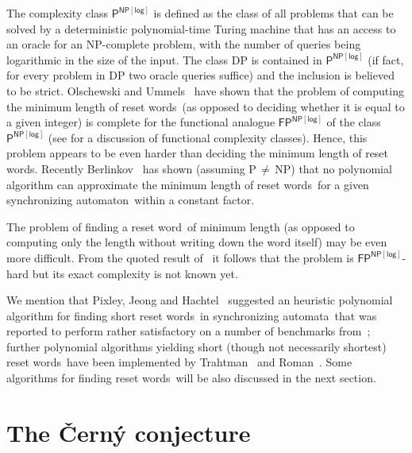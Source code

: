 \documentclass{irmaart}
\newcommand{\sa}{synchronizing au\-tom\-a\-ta}
\newcommand{\san}{synchronizing au\-tom\-a\-ton}
\newcommand{\sw}{reset word}
\newcommand{\sws}{reset words}
\begin{document}
The complexity class $\mathsf{P}^\mathsf{NP[log]}$ is defined as
the class of all problems that can be solved by a deterministic
polynomial-time Turing machine that has an access to an oracle for
an \textsf{NP}-complete problem, with the number of queries being
logarithmic in the size of the input. The class \textsf{DP} is
contained in $\mathsf{P}^\mathsf{NP[log]}$ (if fact, for every
problem in \textsf{DP} two oracle queries suffice) and the
inclusion is believed to be strict. Olschewski and
Ummels~\cite{Olschewski&Ummels:2010} have shown that the problem
of computing the minimum length of \sws\ (as opposed to deciding
whether it is equal to a given integer) is complete for the
functional analogue $\mathsf{FP}^\mathsf{NP[log]}$ of the class
$\mathsf{P}^\mathsf{NP[log]}$ (see \cite{Selman:1994} for a
discussion of functional complexity classes). Hence, this problem
appears to be even harder than deciding the minimum length of
\sws. Recently Berlinkov~\cite{Berlinkov:2010} has shown (assuming
\textsf{P}\,$\ne$\,\textsf{NP}) that no polynomial algorithm can
approximate the minimum length of \sws\ for a given \san\ within a
constant factor.

The problem of finding a \sw\ of minimum length (as opposed to
computing only the length without writing down the word itself)
may be even more difficult. From the quoted result
of~\cite{Olschewski&Ummels:2010} it follows that the problem is
$\mathsf{FP}^\mathsf{NP[log]}$-hard but its exact complexity is
not known yet.

We mention that Pixley, Jeong and
Hachtel~\cite{Pixley&Jeong&Hachtel:1992} suggested an heuristic
polynomial algorithm for finding short \sws\ in \sa\ that was
reported to perform rather satisfactory on a number of benchmarks
from~\cite{Yang:1991}; further polynomial algorithms yielding
short (though not necessarily shortest) \sws\ have been
implemented by Trahtman~\cite{Trahtman:2006} and
Roman~\cite{Roman:2009}. Some algorithms for finding \sws\ will be
also discussed in the next section.

\section{The \v{C}ern\'{y} conjecture}
\end{document}

